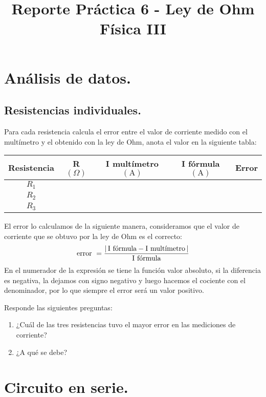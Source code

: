 \documentclass[14pt]{extarticle}
\title{\vspace*{-2cm} Reporte Práctica 6 - Ley de Ohm\\  Física III \vspace{-5ex}}
\date{}
\begin{document}
\maketitle

\section{Análisis de datos.}

\subsection{Resistencias individuales.}

Para cada resistencia calcula el error entre el valor de corriente medido con el multímetro y el obtenido con la ley de Ohm, anota el valor en la siguiente tabla:
\begin{table}[H]
\centering
\begin{tabular}{| c | c | c | c | c | } \hline
Resistencia & R $(\Omega)$ & I multímetro $(\si{\ampere})$ & I fórmula $(\si{\ampere})$ & Error \\ \hline
$R_{1}$ & & & & \\ \hline
$R_{2}$ & & & & \\ \hline
$R_{3}$ & & & & \\ \hline
\end{tabular}
\end{table}
El error lo calculamos de la siguiente manera, consideramos que el valor de corriente que se obtuvo por la ley de Ohm es el correcto:
\begin{align*}
\text{error } = \dfrac{\abs{ \, \text{I fórmula} - \text{I multímetro} \, }}{\text{I fórmula}}
\end{align*}
En el numerador de la expresión se tiene la función valor absoluto, si la diferencia es negativa, la dejamos con signo negativo y luego hacemos el cociente con el denominador, por lo que siempre el error será un valor positivo.

Responde las siguientes preguntas:
\begin{enumerate}
\item ¿Cuál de las tres resistencias tuvo el mayor error en las mediciones de corriente?
\item ¿A qué se debe?
\end{enumerate}

\section{Circuito en serie.}
\end{document}
